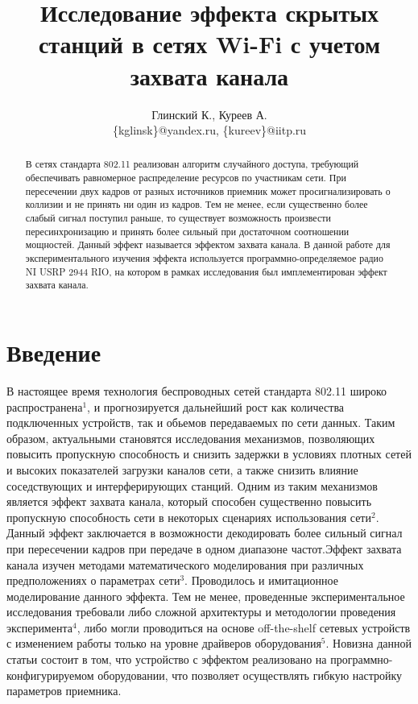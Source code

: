 \documentclass{llncs}
\title{Исследование эффекта скрытых станций в сетях Wi-Fi с учетом захвата канала}
\author{
Глинский К., Куреев А.\\
\{kglinsk\}@yandex.ru, \{kureev\}@iitp.ru\\
}
\institute{ИППИ РАН}
\begin{document}
\maketitle

\begin{abstract}
В сетях стандарта 802.11 реализован алгоритм случайного доступа, требующий обеспечивать равномерное распределение ресурсов по участникам сети. При пересечении двух кадров от разных источников приемник может просигнализировать о коллизии и не принять ни один из кадров. Тем не менее, если существенно более слабый сигнал поступил раньше, то существует  возможность произвести пересинхронизацию и принять более сильный при достаточном соотношении мощностей. Данный эффект называется эффектом захвата канала. В данной работе для экспериментального изучения эффекта используется  программно-определяемое радио NI USRP 2944 RIO, на котором в рамках  исследования  был имплементирован эффект захвата канала.
\end{abstract}


\section{Введение}
В настоящее время технология беспроводных сетей стандарта 802.11 широко распространена$^{1}$, и прогнозируется дальнейший рост как количества подключенных устройств, так и обьемов передаваемых по сети данных. Таким образом, актуальными становятся исследования механизмов, позволяющих повысить пропускную способность и снизить задержки в условиях плотных сетей и высоких показателей загрузки каналов сети, а также снизить влияние соседствующих и интерферирующих станций. Одним из таким механизмов является эффект захвата канала, который способен существенно повысить пропускную способность сети в некоторых сценариях использования сети$^{2}$. Данный эффект заключается в возможности декодировать более сильный сигнал при пересечении кадров при передаче в одном диапазоне частот.Эффект захвата канала изучен методами математического моделирования при различных предположениях о параметрах сети$^{3}$. Проводилось и имитационное моделирование данного эффекта. Тем не менее, проведенные  экспериментальное исследования требовали либо сложной архитектуры и методологии проведения эксперимента$^{4}$, либо могли проводиться на основе off-the-shelf сетевых устройств с изменением работы  только на уровне драйверов оборудования$^{5}$. Новизна данной статьи состоит в том, что устройство с эффектом реализовано на программно-конфигурируемом оборудовании, что позволяет осуществлять гибкую настройку параметров приемника.
\end{document}
